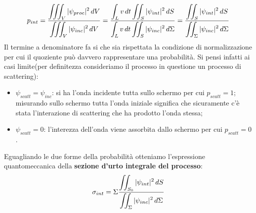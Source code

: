 \begin{equation}
	p_{int} = \fraclarg{\iiint_{V} |\psi_{proc} |^{2} \, dV}{\iiint_{V} |\psi_{inc} |^{2} \, dV} = \fraclarg{\int_{L}  v\, dt \iint_{S}| \psi_{int}|^{2} \, dS}{\int_{L}  v\, dt \iint_{S}| \psi_{inc}|^{2} \, d \Sigma} = \fraclarg{\iint_{S}| \psi_{int}|^{2} \, dS}{\iint_{\Sigma}|\psi_{inc} |^{2}  \, d \Sigma}
	\label{eq:quantum-interaction-probability}
\end{equation}
Il termine a denominatore fa si che sia rispettata la condizione di normalizzazione per cui il quoziente può davvero
rappresentare una probabilità.
Si pensi infatti ai casi limite(per definitezza consideriamo il processo in questione un processo di scattering):
\begin{itemize}
	\item $\psi_{scatt} = \psi_{inc}$: si ha l'onda incidente tutta sullo schermo per cui $ p_{scatt} = 1$;
	misurando sullo schermo tutta l’onda iniziale significa che sicuramente c’è stata l’interazione di
	scattering che ha prodotto l’onda stessa;
	\item $ \psi_{scatt} = 0$: l'interezza dell'onda viene assorbita dallo schermo per cui $ p_{scatt} = 0$.
\end{itemize}
Eguagliando le due forme della probabilità otteniamo l’espressione quantomeccanica della \textbf{sezione d’urto integrale del processo}:
\begin{equation}
	\sigma_{int} = \Sigma \fraclarg{\iint_{S_0} |\psi_{int}|^2 \, dS}{\iint_{\Sigma}|\psi_{inc}|^2 \, d \Sigma}
	\label{eq:integral-interaction-cross-section}
\end{equation}
